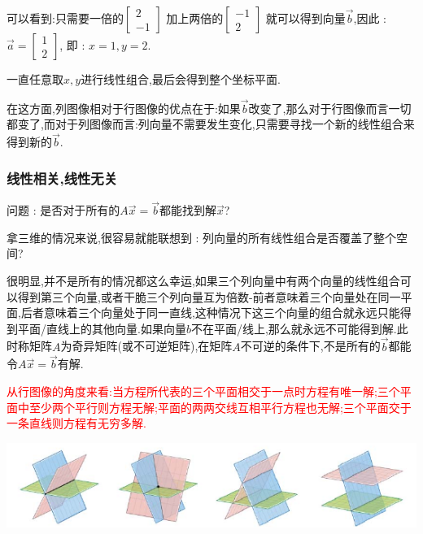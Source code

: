 \documentclass[UTF8,12pt]{ctexbook}
\begin{document}
{{{{{\begin{multicols}{2}
    可以看到:只需要一倍的$\begin{bmatrix}
        2 \\
        -1
      \end{bmatrix}$
    加上两倍的$\begin{bmatrix}
        -1 \\
        2
      \end{bmatrix}$
    就可以得到向量$\vec{b}$,因此 : $\vec{a} = \begin{bmatrix}
        1 \\
        2
      \end{bmatrix}$,
    即 : $x = 1,y = 2$.
  \end{multicols}

  一直任意取$x,y$进行线性组合,最后会得到整个坐标平面.

  在这方面,列图像相对于行图像的优点在于:如果$\vec{b}$改变了,那么对于行图像而言一切都变了,而对于列图像而言:列向量不需要发生变化,只需要寻找一个新的线性组合来得到新的$\vec{b}$.
}%

\subsubsection{线性相关,线性无关}{
  问题 : 是否对于所有的$A\vec{x} = \vec{b}$都能找到解$\vec{x}$?

  拿三维的情况来说,很容易就能联想到 : 列向量的所有线性组合是否覆盖了整个空间?

  很明显,并不是所有的情况都这么幸运,如果三个列向量中有两个向量的线性组合可以得到第三个向量,或者干脆三个列向量互为倍数-前者意味着三个向量处在同一平面,后者意味着三个向量处于同一直线,这种情况下这三个向量的组合就永远只能得到平面/直线上的其他向量.如果向量$b$不在平面/线上,那么就永远不可能得到解.此时称矩阵$A$为奇异矩阵(或不可逆矩阵),在矩阵$A$不可逆的条件下,不是所有的$\vec{b}$都能令$A\vec{x} = \vec{b}$有解.

  \textcolor{red}{从行图像的角度来看:当方程所代表的三个平面相交于一点时方程有唯一解;三个平面中至少两个平行则方程无解;平面的两两交线互相平行方程也无解;三个平面交于一条直线则方程有无穷多解.}

  \begin{center}
    \includegraphics{resources/lineardepedent_independent_1.png}
  \end{center}

}}}}}
\end{document}
